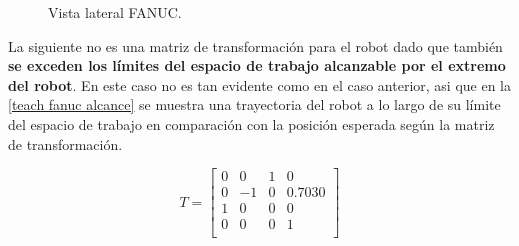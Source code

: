 \documentclass[a4paper,12pt]{article}
\begin{document}
\begin{figure}[H]
    \centering
    \begin{adjustbox}{scale = 0.65, max width=\columnwidth}
    \end{adjustbox}
    \caption{Vista lateral FANUC.}
    \label{alcance fanuc}
\end{figure}

La siguiente no es una matriz de transformación para el robot dado que también \textbf{se exceden
los límites del espacio de trabajo alcanzable por el extremo del robot}. En este caso no es tan evidente como en el caso anterior,
asi que en la \cref{teach fanuc alcance} se muestra una trayectoria del robot a lo largo de su límite del espacio de trabajo en comparación con la posición
esperada según la matriz de transformación.

\begin{equation*}
    T = 
    \begin{bmatrix}
        0  &  0   & 1 & 0      \\
        0  &  -1  & 0 & 0.7030 \\
        1  &  0   & 0 & 0      \\
        0  &  0   & 0 & 1      \\
    \end{bmatrix}
\end{equation*}
\end{document}

